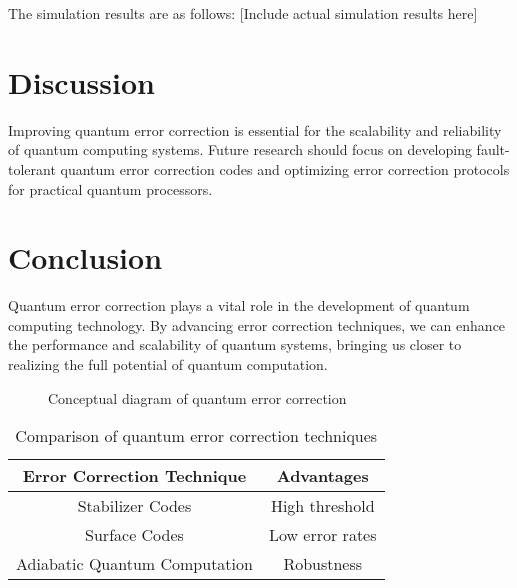 \documentclass{article}
\begin{document}
The simulation results are as follows: [Include actual simulation results here]

\section{Discussion}
Improving quantum error correction is essential for the scalability and reliability of quantum computing systems. Future research should focus on developing fault-tolerant quantum error correction codes and optimizing error correction protocols for practical quantum processors.

\section{Conclusion}
Quantum error correction plays a vital role in the development of quantum computing technology. By advancing error correction techniques, we can enhance the performance and scalability of quantum systems, bringing us closer to realizing the full potential of quantum computation.

\begin{figure}[h]
\centering
\begin{adjustbox}{width=\linewidth}
\end{adjustbox}
\caption{Conceptual diagram of quantum error correction}
\end{figure}

\begin{table}[h]
\centering
\begin{adjustbox}{width=\linewidth}
\begin{tabular}{|c|c|}
\hline
\textbf{Error Correction Technique} & \textbf{Advantages} \\
\hline
Stabilizer Codes & High threshold \\
Surface Codes & Low error rates \\
Adiabatic Quantum Computation & Robustness \\
\hline
\end{tabular}
\end{adjustbox}
\caption{Comparison of quantum error correction techniques}
\end{table}


\end{document}
